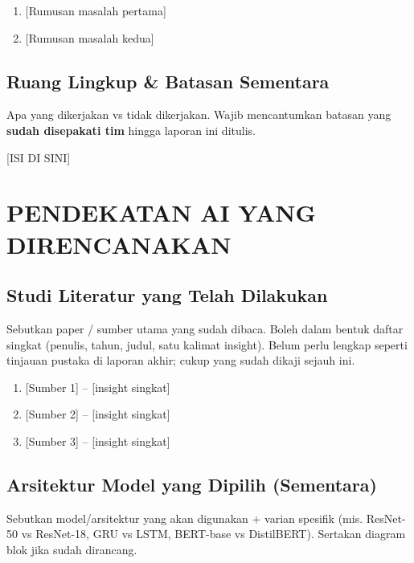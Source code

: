 \documentclass[11pt,a4paper,oneside]{report}
\begin{document}
\begin{enumerate}[label=RM\arabic*.,leftmargin=*]
    \item {[Rumusan masalah pertama]}
    \item {[Rumusan masalah kedua]}
\end{enumerate}

\section{Ruang Lingkup \& Batasan Sementara}
\begin{petunjuk}
Apa yang dikerjakan vs tidak dikerjakan. Wajib mencantumkan batasan yang \textbf{sudah disepakati tim} hingga laporan ini ditulis.
\end{petunjuk}

[ISI DI SINI]

\chapter{PENDEKATAN AI YANG DIRENCANAKAN}
\label{bab:pendekatan}

\section{Studi Literatur yang Telah Dilakukan}
\begin{petunjuk}
Sebutkan paper / sumber utama yang sudah dibaca. Boleh dalam bentuk daftar singkat (penulis, tahun, judul, satu kalimat insight). Belum perlu lengkap seperti tinjauan pustaka di laporan akhir; cukup yang sudah dikaji sejauh ini.
\end{petunjuk}

\begin{enumerate}[leftmargin=*]
    \item {[Sumber 1] -- [insight singkat]}
    \item {[Sumber 2] -- [insight singkat]}
    \item {[Sumber 3] -- [insight singkat]}
\end{enumerate}

\section{Arsitektur Model yang Dipilih (Sementara)}
\begin{petunjuk}
Sebutkan model/arsitektur yang akan digunakan + varian spesifik (mis. ResNet-50 vs ResNet-18, GRU vs LSTM, BERT-base vs DistilBERT). Sertakan diagram blok jika sudah dirancang.
\end{petunjuk}
\end{document}
